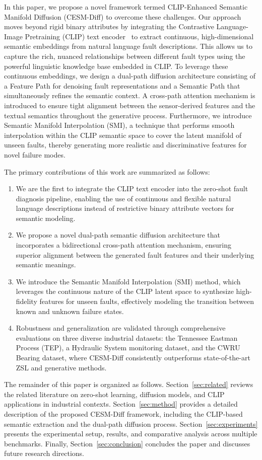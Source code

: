 In this paper, we propose a novel framework termed CLIP-Enhanced Semantic Manifold Diffusion (CESM-Diff) to overcome these challenges. Our approach moves beyond rigid binary attributes by integrating the Contrastive Language-Image Pretraining (CLIP) text encoder~\cite{radford2021learning} to extract continuous, high-dimensional semantic embeddings from natural language fault descriptions. This allows us to capture the rich, nuanced relationships between different fault types using the powerful linguistic knowledge base embedded in CLIP. To leverage these continuous embeddings, we design a dual-path diffusion architecture consisting of a Feature Path for denoising fault representations and a Semantic Path that simultaneously refines the semantic context. A cross-path attention mechanism is introduced to ensure tight alignment between the sensor-derived features and the textual semantics throughout the generative process. Furthermore, we introduce Semantic Manifold Interpolation (SMI), a technique that performs smooth interpolation within the CLIP semantic space to cover the latent manifold of unseen faults, thereby generating more realistic and discriminative features for novel failure modes.

The primary contributions of this work are summarized as follows:
\begin{enumerate}
    \item We are the first to integrate the CLIP text encoder into the zero-shot fault diagnosis pipeline, enabling the use of continuous and flexible natural language descriptions instead of restrictive binary attribute vectors for semantic modeling.
    \item We propose a novel dual-path semantic diffusion architecture that incorporates a bidirectional cross-path attention mechanism, ensuring superior alignment between the generated fault features and their underlying semantic meanings.
    \item We introduce the Semantic Manifold Interpolation (SMI) method, which leverages the continuous nature of the CLIP latent space to synthesize high-fidelity features for unseen faults, effectively modeling the transition between known and unknown failure states.
    \item Robustness and generalization are validated through comprehensive evaluations on three diverse industrial datasets: the Tennessee Eastman Process (TEP), a Hydraulic System monitoring dataset, and the CWRU Bearing dataset, where CESM-Diff consistently outperforms state-of-the-art ZSL and generative methods.
\end{enumerate}

The remainder of this paper is organized as follows. Section~\ref{sec:related} reviews the related literature on zero-shot learning, diffusion models, and CLIP applications in industrial contexts. Section~\ref{sec:method} provides a detailed description of the proposed CESM-Diff framework, including the CLIP-based semantic extraction and the dual-path diffusion process. Section~\ref{sec:experiments} presents the experimental setup, results, and comparative analysis across multiple benchmarks. Finally, Section~\ref{sec:conclusion} concludes the paper and discusses future research directions.
